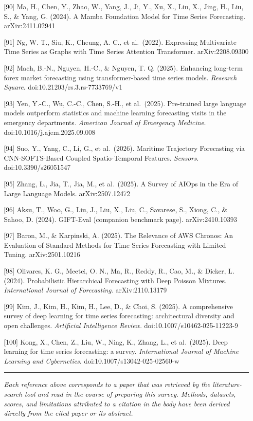 {[}90{]} Ma, H., Chen, Y., Zhao, W., Yang, J., Ji, Y., Xu, X., Liu, X., Jing, H., Liu, S., \& Yang, G. (2024). A Mamba Foundation Model for Time Series Forecasting. arXiv:2411.02941

{[}91{]} Ng, W. T., Siu, K., Cheung, A. C., et al.~(2022). Expressing Multivariate Time Series as Graphs with Time Series Attention Transformer. arXiv:2208.09300

{[}92{]} Mach, B.-N., Nguyen, H.-C., \& Nguyen, T. Q. (2025). Enhancing long-term forex market forecasting using transformer-based time series models. \emph{Research Square}. doi:10.21203/rs.3.rs-7733769/v1

{[}93{]} Yen, Y.-C., Wu, C.-C., Chen, S.-H., et al.~(2025). Pre-trained large language models outperform statistics and machine learning forecasting visits in the emergency departments. \emph{American Journal of Emergency Medicine}. doi:10.1016/j.ajem.2025.09.008

{[}94{]} Suo, Y., Yang, C., Li, G., et al.~(2026). Maritime Trajectory Forecasting via CNN-SOFTS-Based Coupled Spatio-Temporal Features. \emph{Sensors}. doi:10.3390/s26051547

{[}95{]} Zhang, L., Jia, T., Jia, M., et al.~(2025). A Survey of AIOps in the Era of Large Language Models. arXiv:2507.12472

{[}96{]} Aksu, T., Woo, G., Liu, J., Liu, X., Liu, C., Savarese, S., Xiong, C., \& Sahoo, D. (2024). GIFT-Eval (companion benchmark page). arXiv:2410.10393

{[}97{]} Baron, M., \& Karpinski, A. (2025). The Relevance of AWS Chronos: An Evaluation of Standard Methods for Time Series Forecasting with Limited Tuning. arXiv:2501.10216

{[}98{]} Olivares, K. G., Meetei, O. N., Ma, R., Reddy, R., Cao, M., \& Dicker, L. (2024). Probabilistic Hierarchical Forecasting with Deep Poisson Mixtures. \emph{International Journal of Forecasting}. arXiv:2110.13179

{[}99{]} Kim, J., Kim, H., Kim, H., Lee, D., \& Choi, S. (2025). A comprehensive survey of deep learning for time series forecasting: architectural diversity and open challenges. \emph{Artificial Intelligence Review}. doi:10.1007/s10462-025-11223-9

{[}100{]} Kong, X., Chen, Z., Liu, W., Ning, K., Zhang, L., et al.~(2025). Deep learning for time series forecasting: a survey. \emph{International Journal of Machine Learning and Cybernetics}. doi:10.1007/s13042-025-02560-w

\begin{center}\rule{0.5\linewidth}{0.5pt}\end{center}

\emph{Each reference above corresponds to a paper that was retrieved by the literature-search tool and read in the course of preparing this survey. Methods, datasets, scores, and limitations attributed to a citation in the body have been derived directly from the cited paper or its abstract.}
